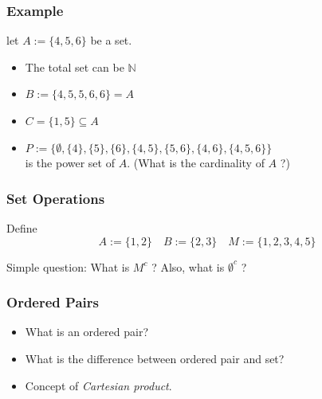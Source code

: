 \documentclass[12pt, t]{beamer}
\renewcommand{\emph}[1]{{\color{Turquoise3}\textsl{#1}}}
\begin{document}
\begin{frame}
    \frametitle{Example}
let $A:= \{4,5,6\}$ be a set.
\begin{itemize}
    \item The total set can be $\mathbb{N}$
    \item $B:= \{4,5,5,6,6\}=A$
    \item $C=\{1,5\}\subseteq A$
    \item $P:=\{\emptyset,\{4\},\{5\},\{6\},\{4,5\},\{5,6\},\{4,6\},\{4,5,6\}\}$ 
    \\\hspace{1em} is the power set of $A$. (What is the cardinality of $A$ ?)
\end{itemize}
\end{frame}

\begin{frame}
    \frametitle{Set Operations}
Define 
\begin{equation*}
    A:=\{1,2\} \quad B:=\{2,3\} \quad M:=\{1,2,3,4,5\}
\end{equation*}
\begin{table}
    \centering
\end{table}  

\par Simple question:
\center What is $M^c$ ? Also, what is $\emptyset^c$ ?
\end{frame}

\begin{frame}
    \frametitle{Ordered Pairs}
\begin{itemize}
    \item What is an ordered pair?
    \item What is the difference between ordered pair and set?
    \item Concept of \emph{Cartesian product}.
\end{itemize}
\end{frame}
\end{document}
